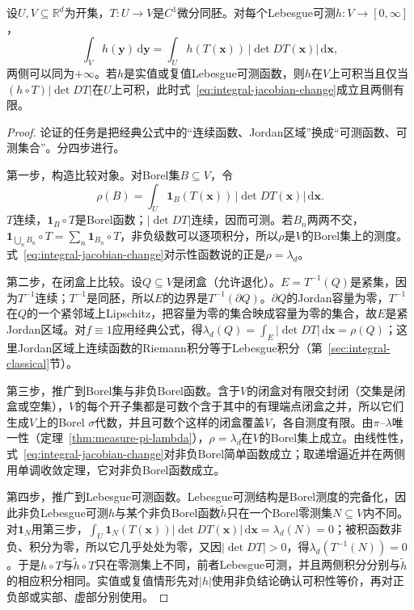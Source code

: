 \begin{theorem}[可逆光滑变换下的换元]
\label{thm:integral-jacobian-change}
设$U,V\subseteq\mathbb R^d$为开集，$T:U\to V$是$C^1$微分同胚。对每个Lebesgue可测$h:V\to[0,\infty]$，
\begin{equation}
 \int_Vh(\bm y)\,\mathrm d\bm y=\int_Uh(T(\bm x))\,|\det DT(\bm x)|\,\mathrm d\bm x,
 \label{eq:integral-jacobian-change}
\end{equation}
两侧可以同为$+\infty$。若$h$是实值或复值Lebesgue可测函数，则$h$在$V$上可积当且仅当$(h\circ T)|\det DT|$在$U$上可积，此时式~\eqref{eq:integral-jacobian-change}成立且两侧有限。
\end{theorem}

\begin{proof}
论证的任务是把经典公式中的“连续函数、Jordan区域”换成“可测函数、可测集合”。分四步进行。

第一步，构造比较对象。对Borel集$B\subseteq V$，令
\[
 \rho(B)=\int_U\mathbf 1_B(T(\bm x))\,|\det DT(\bm x)|\,\mathrm d\bm x.
\]
$T$连续，$\mathbf 1_B\circ T$是Borel函数；$|\det DT|$连续，因而可测。若$B_n$两两不交，$\mathbf 1_{\bigcup_nB_n}\circ T=\sum_n\mathbf 1_{B_n}\circ T$，非负级数可以逐项积分，所以$\rho$是$V$的Borel集上的测度。式~\eqref{eq:integral-jacobian-change}对示性函数说的正是$\rho=\lambda_d$。

第二步，在闭盒上比较。设$Q\subseteq V$是闭盒（允许退化）。$E=T^{-1}(Q)$是紧集，因为$T^{-1}$连续；$T^{-1}$是同胚，所以$E$的边界是$T^{-1}(\partial Q)$。$\partial Q$的Jordan容量为零，$T^{-1}$在$Q$的一个紧邻域上Lipschitz，把容量为零的集合映成容量为零的集合，故$E$是紧Jordan区域。对$f\equiv1$应用经典公式，得$\lambda_d(Q)=\int_E|\det DT|\,\mathrm d\bm x=\rho(Q)$；这里Jordan区域上连续函数的Riemann积分等于Lebesgue积分（第~\ref{sec:integral-classical}节）。

第三步，推广到Borel集与非负Borel函数。含于$V$的闭盒对有限交封闭（交集是闭盒或空集），$V$的每个开子集都是可数个含于其中的有理端点闭盒之并，所以它们生成$V$上的Borel $\sigma$代数，并且可数个这样的闭盒覆盖$V$，各自测度有限。由$\pi$--$\lambda$唯一性（定理~\ref{thm:measure-pi-lambda}），$\rho=\lambda_d$在$V$的Borel集上成立。由线性性，式~\eqref{eq:integral-jacobian-change}对非负Borel简单函数成立；取递增逼近并在两侧用单调收敛定理，它对非负Borel函数成立。

第四步，推广到Lebesgue可测函数。Lebesgue可测结构是Borel测度的完备化，因此非负Lebesgue可测$h$与某个非负Borel函数$\tilde h$只在一个Borel零测集$N\subseteq V$内不同。对$\mathbf 1_N$用第三步，$\int_U\mathbf 1_N(T(\bm x))|\det DT(\bm x)|\,\mathrm d\bm x=\lambda_d(N)=0$；被积函数非负、积分为零，所以它几乎处处为零，又因$|\det DT|>0$，得$\lambda_d(T^{-1}(N))=0$。于是$h\circ T$与$\tilde h\circ T$只在零测集上不同，前者Lebesgue可测，并且两侧积分分别与$\tilde h$的相应积分相同。实值或复值情形先对$|h|$使用非负结论确认可积性等价，再对正负部或实部、虚部分别使用。
\end{proof}

